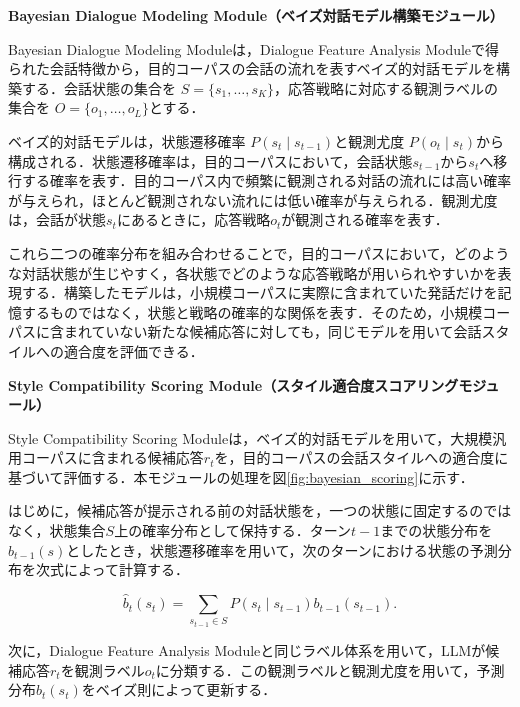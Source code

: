 \documentclass[manuscript,review,anonymous]{acmart}
\begin{document}
\label{mod:bayesian_modeling}
\noindent\textbf{Bayesian Dialogue Modeling Module（ベイズ対話モデル構築モジュール）}\par

Bayesian Dialogue Modeling Moduleは，Dialogue Feature Analysis Moduleで得られた会話特徴から，目的コーパスの会話の流れを表すベイズ的対話モデルを構築する．会話状態の集合を
$S=\{s_1,\ldots,s_K\}$，応答戦略に対応する観測ラベルの集合を
$O=\{o_1,\ldots,o_L\}$とする．

ベイズ的対話モデルは，状態遷移確率
$P(s_t\mid s_{t-1})$と観測尤度
$P(o_t\mid s_t)$から構成される．状態遷移確率は，目的コーパスにおいて，会話状態$s_{t-1}$から$s_t$へ移行する確率を表す．目的コーパス内で頻繁に観測される対話の流れには高い確率が与えられ，ほとんど観測されない流れには低い確率が与えられる．観測尤度は，会話が状態$s_t$にあるときに，応答戦略$o_t$が観測される確率を表す．

これら二つの確率分布を組み合わせることで，目的コーパスにおいて，どのような対話状態が生じやすく，各状態でどのような応答戦略が用いられやすいかを表現する．構築したモデルは，小規模コーパスに実際に含まれていた発話だけを記憶するものではなく，状態と戦略の確率的な関係を表す．そのため，小規模コーパスに含まれていない新たな候補応答に対しても，同じモデルを用いて会話スタイルへの適合度を評価できる．

\label{mod:scoring}
\noindent\textbf{Style Compatibility Scoring Module（スタイル適合度スコアリングモジュール）}\par

Style Compatibility Scoring Moduleは，ベイズ的対話モデルを用いて，大規模汎用コーパスに含まれる候補応答$r_t$を，目的コーパスの会話スタイルへの適合度に基づいて評価する．本モジュールの処理を図\ref{fig:bayesian_scoring}に示す．

はじめに，候補応答が提示される前の対話状態を，一つの状態に固定するのではなく，状態集合$S$上の確率分布として保持する．ターン$t-1$までの状態分布を$b_{t-1}(s)$としたとき，状態遷移確率を用いて，次のターンにおける状態の予測分布を次式によって計算する．

\begin{equation}
  \hat{b}_t(s_t)
  =
  \sum_{s_{t-1}\in S}
  P(s_t\mid s_{t-1})
  b_{t-1}(s_{t-1}).
  \label{eq:predict}
\end{equation}

次に，Dialogue Feature Analysis Moduleと同じラベル体系を用いて，LLMが候補応答$r_t$を観測ラベル$o_t$に分類する．この観測ラベルと観測尤度を用いて，予測分布$\hat{b}_t(s_t)$をベイズ則によって更新する．
\end{document}
